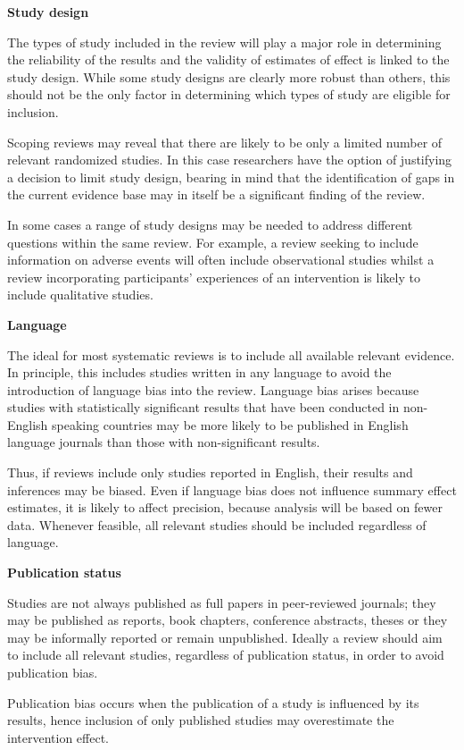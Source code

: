 \documentclass[
  11pt,
  a4paper,
  DIV=11,
  numbers=noendperiod]{scrreprt}
\begin{document}
\textbf{Study design}

The types of study included in the review will play a major role in
determining the reliability of the results and the validity of estimates
of effect is linked to the study design. While some study designs are
clearly more robust than others, this should not be the only factor in
determining which types of study are eligible for inclusion.

Scoping reviews may reveal that there are likely to be only a limited
number of relevant randomized studies. In this case researchers have the
option of justifying a decision to limit study design, bearing in mind
that the identification of gaps in the current evidence base may in
itself be a significant finding of the review.

In some cases a range of study designs may be needed to address
different questions within the same review. For example, a review
seeking to include information on adverse events will often include
observational studies whilst a review incorporating participants'
experiences of an intervention is likely to include qualitative studies.

\textbf{Language}

The ideal for most systematic reviews is to include all available
relevant evidence. In principle, this includes studies written in any
language to avoid the introduction of language bias into the review.
Language bias arises because studies with statistically significant
results that have been conducted in non-English speaking countries may
be more likely to be published in English language journals than those
with non-significant results.

Thus, if reviews include only studies reported in English, their results
and inferences may be biased. Even if language bias does not influence
summary effect estimates, it is likely to affect precision, because
analysis will be based on fewer data. Whenever feasible, all relevant
studies should be included regardless of language.

\textbf{Publication status}

Studies are not always published as full papers in peer-reviewed
journals; they may be published as reports, book chapters, conference
abstracts, theses or they may be informally reported or remain
unpublished. Ideally a review should aim to include all relevant
studies, regardless of publication status, in order to avoid publication
bias.

Publication bias occurs when the publication of a study is influenced by
its results, hence inclusion of only published studies may overestimate
the intervention effect.
\end{document}
